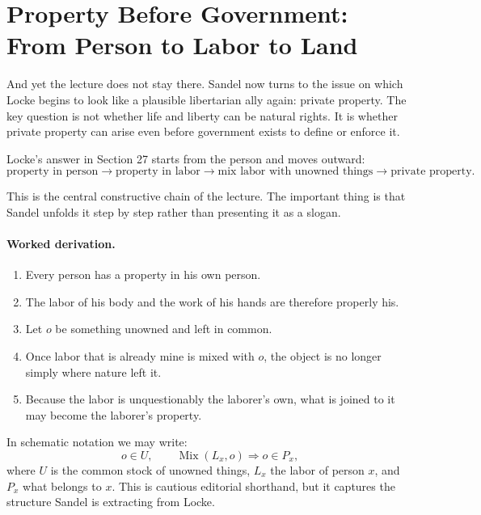 \section{Property Before Government: From Person to Labor to Land}

And yet the lecture does not stay there. Sandel now turns to the issue on which Locke begins to look like a plausible libertarian ally again: private property. The key question is not whether life and liberty can be natural rights. It is whether private property can arise even before government exists to define or enforce it.

Locke's answer in Section 27 starts from the person and moves outward:
\begin{equation}
\text{property in person}\to \text{property in labor}\to \text{mix labor with unowned things}\to \text{private property}.
\end{equation}

This is the central constructive chain of the lecture. The important thing is that Sandel unfolds it step by step rather than presenting it as a slogan.

\paragraph{Worked derivation.}
\begin{enumerate}
\item Every person has a property in his own person.
\item The labor of his body and the work of his hands are therefore properly his.
\item Let \(o\) be something unowned and left in common.
\item Once labor that is already mine is mixed with \(o\), the object is no longer simply where nature left it.
\item Because the labor is unquestionably the laborer's own, what is joined to it may become the laborer's property.
\end{enumerate}

In schematic notation we may write:
\begin{equation}
o\in U,\qquad \operatorname{Mix}(L_x,o)\Longrightarrow o\in P_x,
\end{equation}
where \(U\) is the common stock of unowned things, \(L_x\) the labor of person \(x\), and \(P_x\) what belongs to \(x\). This is cautious editorial shorthand, but it captures the structure Sandel is extracting from Locke.

